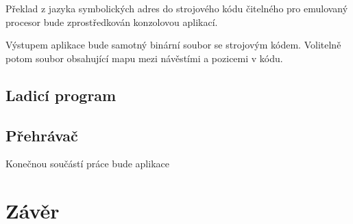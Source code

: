 Překlad z jazyka symbolických adres do strojového kódu čitelného pro emulovaný procesor bude zprostředkován konzolovou aplikací.

Výstupem aplikace bude samotný binární soubor se strojovým kódem. Volitelně potom soubor obsahující mapu mezi návěstími a pozicemi v kódu.

\blind[1]

\subsection{Ladicí program}

\blind[2]

\subsection{Přehrávač}

Konečnou součástí práce bude aplikace

\section{Závěr}

\blind[1]